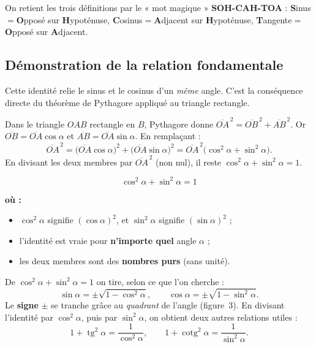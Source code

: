 \documentclass[11pt,a4paper]{article}
\newenvironment{ou}{%
  \par\smallskip\noindent\textbf{où :}\nopagebreak
  \begin{itemize}[leftmargin=1.8em,topsep=2pt,itemsep=1.5pt,parsep=0pt]}%
  {\end{itemize}}
\DeclareMathOperator{\tg}{tg}        %
\DeclareMathOperator{\cotg}{cotg}    %
\begin{document}
\begin{remarque}
On retient les trois définitions par le « mot magique » \textbf{SOH-CAH-TOA} :
\textbf{S}inus${}={}$\textbf{O}pposé sur \textbf{H}ypoténuse, \textbf{C}osinus${}={}$\textbf{A}djacent
sur \textbf{H}ypoténuse, \textbf{T}angente${}={}$\textbf{O}pposé sur \textbf{A}djacent.
\end{remarque}

\subsection{Démonstration de la relation fondamentale}
Cette identité relie le sinus et le cosinus d'un \emph{même} angle. C'est la conséquence directe du
théorème de Pythagore appliqué au triangle rectangle.

\begin{theoreme}
Dans le triangle $OAB$ rectangle en $B$, Pythagore donne
$\overline{OA}^{\,2}=\overline{OB}^{\,2}+\overline{AB}^{\,2}$.
Or $\overline{OB}=\overline{OA}\cos\alpha$ et $\overline{AB}=\overline{OA}\sin\alpha$. En remplaçant :
\[
\overline{OA}^{\,2}=\bigl(\overline{OA}\cos\alpha\bigr)^2+\bigl(\overline{OA}\sin\alpha\bigr)^2
=\overline{OA}^{\,2}\bigl(\cos^2\alpha+\sin^2\alpha\bigr).
\]
En divisant les deux membres par $\overline{OA}^{\,2}$ (non nul), il reste
$\cos^2\alpha+\sin^2\alpha=1$.
\end{theoreme}

\begin{formule}
\[
\boxed{\;\cos^2\alpha+\sin^2\alpha=1\;}
\]
\begin{ou}
  \item $\cos^2\alpha$ signifie $(\cos\alpha)^2$, et $\sin^2\alpha$ signifie $(\sin\alpha)^2$ ;
  \item l'identité est vraie pour \textbf{n'importe quel} angle $\alpha$ ;
  \item les deux membres sont des \textbf{nombres purs} (sans unité).
\end{ou}
\end{formule}

\begin{remarque}
De $\cos^2\alpha+\sin^2\alpha=1$ on tire, selon ce que l'on cherche :
\[
\sin\alpha=\pm\sqrt{1-\cos^2\alpha},\qquad
\cos\alpha=\pm\sqrt{1-\sin^2\alpha}.
\]
Le \textbf{signe} $\pm$ se tranche grâce au \emph{quadrant} de l'angle (figure~3). En divisant
l'identité par $\cos^2\alpha$, puis par $\sin^2\alpha$, on obtient deux autres relations utiles :
\[
1+\tg^2\alpha=\frac{1}{\cos^2\alpha},\qquad 1+\cotg^2\alpha=\frac{1}{\sin^2\alpha}.
\]
\end{remarque}
\end{document}
